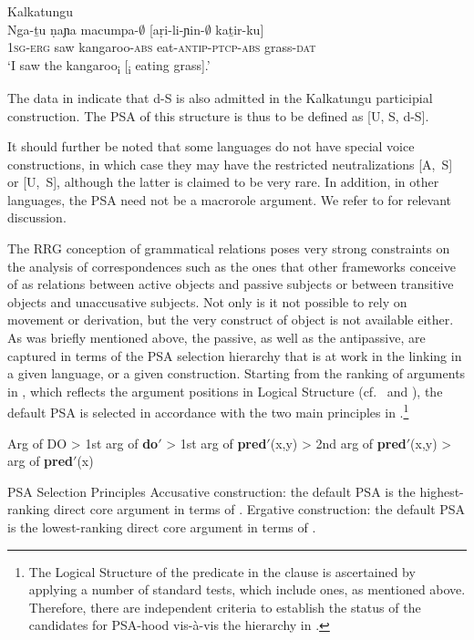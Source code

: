\documentclass[output=paper,hidelinks]{langscibook}
\begin{document}
\ea%
   \label{ex:RRG:19}Kalkatungu \citep[98]{VanValin2005}\\
   \gll        Nga-\b{t}u   ṇaɲa  macumpa-$\emptyset$  [aṛi-li-ɲin-$\emptyset$    ka\b{t}ir-ku]\\
      \textsc{1sg-erg}   saw  kangaroo-\textsc{abs}  eat\textsc{-antip-ptcp-abs}  grass-\textsc{dat}\\
   \glt `I saw the kangaroo\textsubscript{i} [\GAP\textsubscript{i} eating grass].'
   \z

\noindent The data in  indicate that d-S is also admitted in the Kalkatungu participial construction. The PSA of this structure is thus to be defined as [U, S, d-S].

  It should further be noted that some languages do not have special voice constructions, in which case they may have the restricted neutralizations [A,~S] or [U,~S], although the latter is claimed to be very rare. In addition, in other languages, the PSA need not be a macrorole argument. We refer to \citet[352-363]{VanValin1997} for relevant discussion.

  The RRG conception of grammatical relations poses very strong constraints on the analysis of correspondences such as the ones that other frameworks conceive of as  relations between active objects and passive subjects or between transitive objects and unaccusative subjects. Not only is it not possible to rely on movement or derivation, but the very construct of object is not available either. As was briefly mentioned above, the passive, as well as the antipassive, are captured in terms of the PSA selection hierarchy that is at work in the linking in a given language, or a given construction. Starting from the ranking of arguments in , which reflects the argument positions in Logical Structure (cf.\  and ), the default PSA is selected in accordance with the two main principles in .\footnote{The Logical Structure of the predicate in the clause is ascertained by applying a number of standard tests, which include  ones, as mentioned above. Therefore, there are independent criteria to establish the status of the candidates for PSA-hood vis-à-vis the hierarchy in .}

\ea%
   \label{ex:RRG:20}
   Arg of DO > 1st arg of \textbf{do$'$} > 1st arg of \textbf{pred$'$}(x,y) > 2nd arg of \textbf{pred$'$}(x,y) > arg of \textbf{pred$'$}(x)
   \z

\ea%
\label{ex:RRG:21}PSA Selection Principles
\ea\label{ex:RRG:21a} Accusative construction: the default PSA is the highest-ranking direct core argument in terms of .
\ex\label{ex:RRG:21b} Ergative construction: the default PSA is the lowest-ranking direct core argument in terms of .
   \z\z
\end{document}
